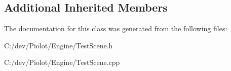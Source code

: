 \subsection*{Additional Inherited Members}


The documentation for this class was generated from the following files\+:\begin{DoxyCompactItemize}
\item 
C\+:/dev/\+Piolot/\+Engine/Test\+Scene.\+h\item 
C\+:/dev/\+Piolot/\+Engine/Test\+Scene.\+cpp\end{DoxyCompactItemize}
